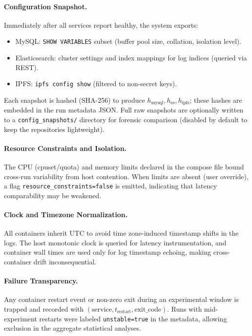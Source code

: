 \paragraph{Configuration Snapshot.} Immediately after all services report healthy, the system exports:
\begin{itemize}
  \item MySQL: \texttt{SHOW VARIABLES} subset (buffer pool size, collation, isolation level).
  \item Elasticsearch: cluster settings and index mappings for log indices (queried via REST).
  \item IPFS: \texttt{ipfs config show} (filtered to non-secret keys).
\end{itemize}
Each snapshot is hashed (SHA-256) to produce $h_{\text{mysql}}, h_{\text{es}}, h_{\text{ipfs}}$; these hashes are embedded in the run metadata JSON. Full raw snapshots are optionally written to a \texttt{config\_snapshots/} directory for forensic comparison (disabled by default to keep the repositories lightweight).

\paragraph{Resource Constraints and Isolation.} The CPU (cpuset/quota) and memory limits declared in the compose file bound cross-run variability from host contention. When limits are absent (user override), a flag \texttt{resource\_constraints=false} is emitted, indicating that latency comparability may be weakened.

\paragraph{Clock and Timezone Normalization.} All containers inherit UTC to avoid time zone-induced timestamp shifts in the logs. The host monotonic clock is queried for latency instrumentation, and container wall times are used only for log timestamp echoing, making cross-container drift inconsequential.

\paragraph{Failure Transparency.} Any container restart event or non-zero exit during an experimental window is trapped and recorded with $(\text{service}, t_{\text{restart}}, \text{exit\_code})$. Runs with mid-experiment restarts were labeled \texttt{unstable=true} in the metadata, allowing exclusion in the aggregate statistical analyses.

